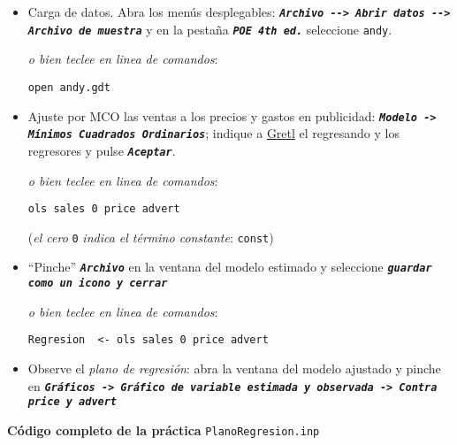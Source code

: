 \documentclass[11pt]{article}
\begin{document}
\begin{itemize}
\item Carga de datos. Abra los menús desplegables: \textbf{\emph{\texttt{Archivo -{}-> Abrir
  datos -{}-> Archivo de muestra}}} y en la pestaña \textbf{\emph{\texttt{POE 4th ed.}}}
seleccione \texttt{andy}.

{\vspace{1pt} \footnotesize \color{gray!70!black}
\emph{o bien teclee en linea de comandos}:
\begin{verbatim}
open andy.gdt
\end{verbatim}
}

\item Ajuste por MCO las ventas a los precios y gastos en publicidad:
\textbf{\emph{\texttt{Modelo -> Mínimos Cuadrados Ordinarios}}}; indique a \href{https://gretl.sourceforge.net/es.html}{Gretl} el
regresando y los regresores y pulse \textbf{\emph{\texttt{Aceptar}}}.

{\vspace{1pt} \footnotesize \color{gray!70!black} \color{gray!70!black}
\emph{o bien teclee en linea de comandos}:
\begin{verbatim}
ols sales 0 price advert
\end{verbatim}
(\emph{el cero} \texttt{0} \emph{indica el término constante}: \texttt{const})
}

\item ``Pinche'' \textbf{\emph{\texttt{Archivo}}} en la ventana del modelo estimado y
seleccione \textbf{\emph{\texttt{guardar como un icono y cerrar}}}

{\vspace{1pt} \footnotesize \color{gray!70!black} \color{gray!70!black}
\emph{o bien teclee en linea de comandos}:
\begin{verbatim}
Regresion  <- ols sales 0 price advert
\end{verbatim}
}

\item Observe el \emph{plano de regresión}: abra la ventana del modelo ajustado
y pinche en \textbf{\emph{\texttt{Gráficos -> Gráfico de variable estimada y observada
  -> Contra price y advert}}}

{\vspace{1pt} \footnotesize \color{gray!70!black} \color{gray!70!black}
}
\end{itemize}

\vspace{10pt}
\noindent
\textbf{Código completo de la práctica} \texttt{PlanoRegresion.inp}
\vspace{10pt}

\clearpage
\end{document}
